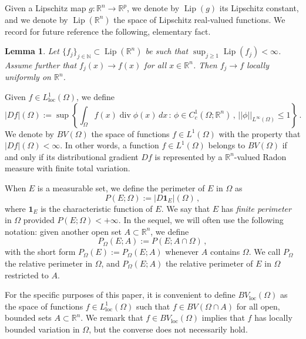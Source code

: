 \documentclass[a4paper,reqno,11pt]{amsart}
\newtheorem{lemma}[theorem]{Lemma}
\newcommand{\N}{\mathbb{N}}
\newcommand{\R}{\mathbb{R}}
\newcommand{\loc}{\mathop{\mathrm{loc}}}
\renewcommand{\div}{\mathop{\mathrm{div}}}
\newcommand{\ch}{\mathbf{1}}
\newcommand{\Lip}{\mathop{\mathrm{Lip}}}
\newcommand{\pr}{P_{\Omega}}
\newcommand{\p}{P}
\begin{document}
Given a Lipschitz map $g:\R^{n}\to \R^{p}$, we denote by $\Lip(g)$ its Lipschitz constant, and we denote by $\Lip(\R^{n})$ the space of Lipschitz real-valued functions. We record for future reference the following, elementary fact.
\begin{lemma} \label{lem:uniflem}
Let $\{f_{j}\}_{j\in \N} \subset \Lip(\R^{n})$ be such that $\sup_{j \geq 1} \Lip(f_{j}) < \infty$. Assume further that $f_{j}(x)\rightarrow f(x)$ for all $x\in \R^{n}$. Then $f_{j}\rightarrow f$ locally uniformly on $\R^{n}$.
\end{lemma}

Given $f \in L^{1}_{\loc}(\Omega)$, we define
\begin{equation*} %
	|Df|(\Omega) := \sup \left \{ \int_{\Omega} f(x) \div \phi (x) \, dx \, : \, \phi \in C^{1}_{c}(\Omega; \R^{n}) \, , \, ||\phi||_{L^{\infty}(\Omega)} \leq 1 \right \} \, .
\end{equation*}
We denote by $BV(\Omega)$ the space of functions $f \in L^{1}(\Omega)$ with the property that $|Df|(\Omega) < \infty$. In other words, a function $f\in L^{1}(\Omega)$ belongs to $BV(\Omega)$ if and only if its distributional gradient $Df$ is represented by a $\R^{n}$-valued Radon measure with finite total variation. 

When $E$ is a measurable set, we define the perimeter of $E$ in $\Omega$ as
\begin{equation*}
	\p(E;\Omega) := |D \ch_{E}|(\Omega) \, ,
\end{equation*}
where $\ch_{E}$ is the characteristic function of $E$. We say that $E$ has \emph{finite perimeter} in $\Omega$ provided $\p(E;\Omega) < + \infty$. In the sequel, we will often use the following notation: given another open set $A \subset \R^n$, we define
	\begin{equation*}
		\pr(E;A) := \p(E;A \cap \Omega) \, ,
	\end{equation*}
with the short form $\pr(E) := \pr(E;A)$ whenever $A$ contains $\Omega$. We call $\pr$ the relative perimeter in $\Omega$, and $\pr(E;A)$ the relative perimeter of $E$ in $\Omega$ restricted to $A$. 

For the specific purposes of this paper, it is convenient to define $BV_{\loc}(\Omega)$ as the space of functions $f \in L^1_{\loc}(\Omega)$ such that $f \in BV(\Omega \cap A)$ for all open, bounded sets $A\subset \R^{n}$. We remark that $f \in BV_{\loc}(\Omega)$ implies that $f$ has locally bounded variation in $\Omega$, but the converse does not necessarily hold.
\end{document}
